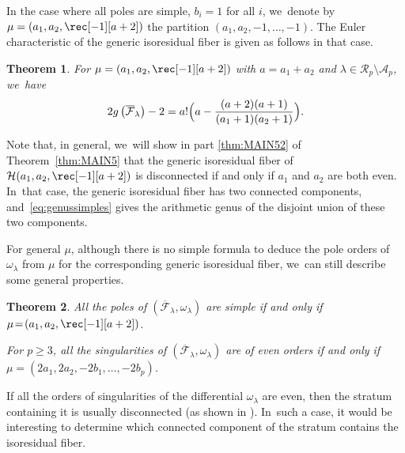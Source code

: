 \documentclass[JEP,XML,SOM,Unicode,NoFloatCountersInSection,published]{cedram}
\newcommand\calH{{\mathcal H}}
\newtheorem{thm}{Theorem}[section]
\theoremstyle{definition}
\begin{document}
In the case where all poles are simple, \ie $b_i = 1$ for all $i$, we~denote by $\mu = (a_1, a_2, \rec[-1][a+2])$ the partition $(a_{1},a_{2},-1,\dots,-1)$. The Euler characteristic of the generic isoresidual fiber is given as follows in that case.

\begin{thm}\label{thm:simple}
For $\mu = (a_1, a_2, \rec[-1][a+2])$ with $a=a_{1}+a_{2}$ and $\lambda\in \mathcal{R}_{p} \setminus \mathcal{A}_{p}$, we~have
\begin{equation}\label{eq:genussimples}
2g\left(\overline{\mathcal{F}}_{\lambda}\right)-2 =
a! \Bigl(a - \frac{(a+2)(a+1)}{(a_1+1)(a_2+1)} \Bigr).
\end{equation}
\end{thm}

Note that, in general, we~will show in part \eqref{thm:MAIN52} of Theorem~\ref{thm:MAIN5} that the generic isoresidual fiber of $\calH(a_1, a_2, \rec[-1][a+2])$ is disconnected if and only if $a_1$ and $a_2$ are both even. In~that case, the generic isoresidual fiber has two connected components, and~\eqref{eq:genussimples} gives the arithmetic genus of the disjoint union of these two components.

For general $\mu$, although there is no simple formula to deduce the pole orders of~$\omega_\lambda$ from $\mu$ for the corresponding generic isoresidual fiber, we~can still describe some general properties.

\begin{thm}\label{thm:MAIN3}
All the poles of $(\overline{\mathcal{F}}_{\lambda},\omega_{\lambda})$ are simple if and only if $\mu\!=\!(a_1, a_2, \rec[-1][a+2])$.

For $p \geq 3$, all the singularities of $(\overline{\mathcal{F}}_{\lambda},\omega_{\lambda})$ are of even orders if and only if $\mu=(2a_{1},2a_{2},-2b_{1},\dots,-2b_{p})$.
\end{thm}

If all the orders of singularities of the differential $\omega_{\lambda}$ are even, then the stratum containing it is usually disconnected (as shown in \cite{Bo}). In~such a case, it would be interesting to determine which connected component of the stratum contains the isoresidual fiber.
\end{document}
